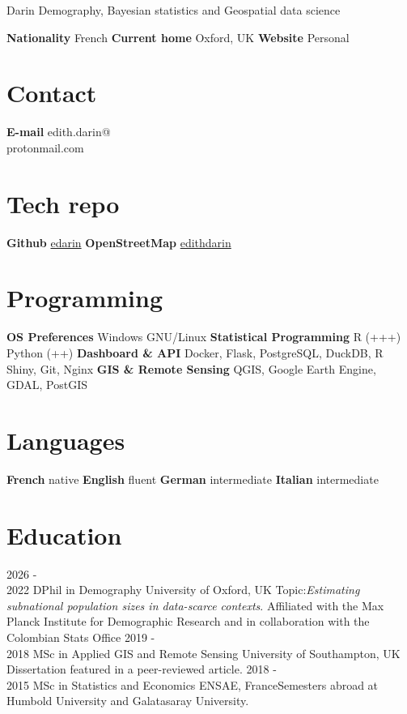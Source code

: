 \documentclass[
]{friggeri-cv}
\author{}
\date{\vspace{-2.5em}}
\begin{document}
 { Darin}
{\qquad \qquad  \qquad  \qquad Demography, Bayesian statistics and Geospatial data science}


\begin{aside}
\textbf{Nationality}
French
\textbf{Current home}
Oxford, UK
\textbf{Website}
Personal \href{https://edarin.github.io/thatsme/}{\scriptsize{}}
~
\section{Contact}
\textbf{E-mail}
edith.darin@\\protonmail.com
~
\section{Tech repo}
\textbf{Github}
\href{https://github.com/edarin}{edarin}
\textbf{OpenStreetMap}
\href{https://www.openstreetmap.org/user/edithdarin/history#map=5/22.938/11.470}{edithdarin}
~
\section{Programming}
\textbf{OS Preferences}
Windows
GNU/Linux
\textbf{Statistical Programming}
R (+++)
Python (++)
\textbf{Dashboard \& API}
Docker, Flask, PostgreSQL, DuckDB, R Shiny, Git, Nginx
\textbf{GIS \& Remote Sensing}
QGIS, Google Earth Engine, GDAL, PostGIS
~
\section{Languages}
\textbf{French} native
\textbf{English} fluent
\textbf{German} intermediate
\textbf{Italian} intermediate
~
\end{aside}
\section{Education}
\begin{entrylist}
\entry
{2026 - \\ 2022}
{DPhil in Demography}
{University of Oxford, UK}
{Topic:\textit{Estimating subnational population sizes in data-scarce contexts}. Affiliated with the Max Planck Institute for Demographic Research and in collaboration with the Colombian Stats Office}
\entry
{2019 - \\ 2018}
{MSc in Applied GIS and Remote Sensing}
{University of Southampton, UK}
{Dissertation featured in a peer-reviewed article.}
\entry
{2018 - \\ 2015}
{MSc in Statistics and Economics}
{ENSAE, France}{Semesters abroad at Humbold University and Galatasaray University.}
\end{entrylist}
\end{document}
